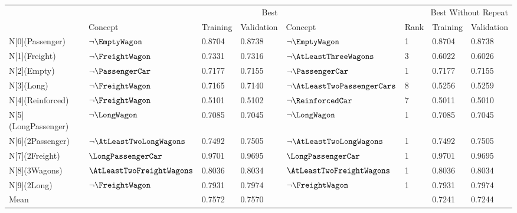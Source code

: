 \begin{tabular}{llllllll}
\toprule
 & \multicolumn{3}{r}{Best} & \multicolumn{4}{r}{Best Without Repeat} \\
 & Concept & Training & Validation & Concept & Rank & Training & Validation \\
\midrule
N[0](Passenger) & $\neg \EmptyWagon$ & 0.8704 & 0.8738 & $\neg \EmptyWagon$ & 1 & 0.8704 & 0.8738 \\
N[1](Freight) & $\neg \FreightWagon$ & 0.7331 & 0.7316 & $\neg \AtLeastThreeWagons$ & 3 & 0.6022 & 0.6026 \\
N[2](Empty) & $\neg \PassengerCar$ & 0.7177 & 0.7155 & $\neg \PassengerCar$ & 1 & 0.7177 & 0.7155 \\
N[3](Long) & $\neg \FreightWagon$ & 0.7165 & 0.7140 & $\neg \AtLeastTwoPassengerCars$ & 8 & 0.5256 & 0.5259 \\
N[4](Reinforced) & $\neg \FreightWagon$ & 0.5101 & 0.5102 & $\neg \ReinforcedCar$ & 7 & 0.5011 & 0.5010 \\
N[5](LongPassenger) & $\neg \LongWagon$ & 0.7085 & 0.7045 & $\neg \LongWagon$ & 1 & 0.7085 & 0.7045 \\
N[6](2Passenger) & $\neg \AtLeastTwoLongWagons$ & 0.7492 & 0.7505 & $\neg \AtLeastTwoLongWagons$ & 1 & 0.7492 & 0.7505 \\
N[7](2Freight) & $\LongPassengerCar$ & 0.9701 & 0.9695 & $\LongPassengerCar$ & 1 & 0.9701 & 0.9695 \\
N[8](3Wagons) & $\AtLeastTwoFreightWagons$ & 0.8036 & 0.8034 & $\AtLeastTwoFreightWagons$ & 1 & 0.8036 & 0.8034 \\
N[9](2Long) & $\neg \FreightWagon$ & 0.7931 & 0.7974 & $\neg \FreightWagon$ & 1 & 0.7931 & 0.7974 \\
Mean &  & 0.7572 & 0.7570 &  &  & 0.7241 & 0.7244 \\
\bottomrule
\end{tabular}
